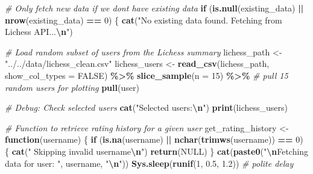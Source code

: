 \documentclass[
]{article}
\newenvironment{Shaded}{\begin{snugshade}}{\end{snugshade}}
\newcommand{\AttributeTok}[1]{\textcolor[rgb]{0.13,0.29,0.53}{#1}}
\newcommand{\CommentTok}[1]{\textcolor[rgb]{0.56,0.35,0.01}{\textit{#1}}}
\newcommand{\ConstantTok}[1]{\textcolor[rgb]{0.56,0.35,0.01}{#1}}
\newcommand{\ControlFlowTok}[1]{\textcolor[rgb]{0.13,0.29,0.53}{\textbf{#1}}}
\newcommand{\DecValTok}[1]{\textcolor[rgb]{0.00,0.00,0.81}{#1}}
\newcommand{\FloatTok}[1]{\textcolor[rgb]{0.00,0.00,0.81}{#1}}
\newcommand{\FunctionTok}[1]{\textcolor[rgb]{0.13,0.29,0.53}{\textbf{#1}}}
\newcommand{\NormalTok}[1]{#1}
\newcommand{\OtherTok}[1]{\textcolor[rgb]{0.56,0.35,0.01}{#1}}
\newcommand{\SpecialCharTok}[1]{\textcolor[rgb]{0.81,0.36,0.00}{\textbf{#1}}}
\newcommand{\StringTok}[1]{\textcolor[rgb]{0.31,0.60,0.02}{#1}}
\begin{document}
\begin{Shaded}
\begin{Highlighting}[]
\CommentTok{\# Only fetch new data if we don\textquotesingle{}t have existing data}
\ControlFlowTok{if}\NormalTok{ (}\FunctionTok{is.null}\NormalTok{(existing\_data) }\SpecialCharTok{||} \FunctionTok{nrow}\NormalTok{(existing\_data) }\SpecialCharTok{==} \DecValTok{0}\NormalTok{) \{}
    \FunctionTok{cat}\NormalTok{(}\StringTok{"No existing data found. Fetching from Lichess API...}\SpecialCharTok{\textbackslash{}n}\StringTok{"}\NormalTok{)}

    \CommentTok{\# Load random subset of users from the Lichess summary}
\NormalTok{    lichess\_path }\OtherTok{\textless{}{-}} \StringTok{"../../data/lichess\_clean.csv"}
\NormalTok{    lichess\_users }\OtherTok{\textless{}{-}} \FunctionTok{read\_csv}\NormalTok{(lichess\_path, }\AttributeTok{show\_col\_types =} \ConstantTok{FALSE}\NormalTok{) }\SpecialCharTok{\%\textgreater{}\%}
        \FunctionTok{slice\_sample}\NormalTok{(}\AttributeTok{n =} \DecValTok{15}\NormalTok{) }\SpecialCharTok{\%\textgreater{}\%} \CommentTok{\# pull 15 random users for plotting}
        \FunctionTok{pull}\NormalTok{(user)}

    \CommentTok{\# Debug: Check selected users}
    \FunctionTok{cat}\NormalTok{(}\StringTok{"Selected users:}\SpecialCharTok{\textbackslash{}n}\StringTok{"}\NormalTok{)}
    \FunctionTok{print}\NormalTok{(lichess\_users)}

    \CommentTok{\# Function to retrieve rating history for a given user}
\NormalTok{    get\_rating\_history }\OtherTok{\textless{}{-}} \ControlFlowTok{function}\NormalTok{(username) \{}
        \ControlFlowTok{if}\NormalTok{ (}\FunctionTok{is.na}\NormalTok{(username) }\SpecialCharTok{||} \FunctionTok{nchar}\NormalTok{(}\FunctionTok{trimws}\NormalTok{(username)) }\SpecialCharTok{==} \DecValTok{0}\NormalTok{) \{}
            \FunctionTok{cat}\NormalTok{(}\StringTok{"  Skipping invalid username}\SpecialCharTok{\textbackslash{}n}\StringTok{"}\NormalTok{)}
            \FunctionTok{return}\NormalTok{(}\ConstantTok{NULL}\NormalTok{)}
\NormalTok{        \}}
        \FunctionTok{cat}\NormalTok{(}\FunctionTok{paste0}\NormalTok{(}\StringTok{"}\SpecialCharTok{\textbackslash{}n}\StringTok{Fetching data for user: "}\NormalTok{, username, }\StringTok{"}\SpecialCharTok{\textbackslash{}n}\StringTok{"}\NormalTok{))}
        \FunctionTok{Sys.sleep}\NormalTok{(}\FunctionTok{runif}\NormalTok{(}\DecValTok{1}\NormalTok{, }\FloatTok{0.5}\NormalTok{, }\FloatTok{1.2}\NormalTok{)) }\CommentTok{\# polite delay}


\end{Highlighting}
\end{Shaded}
\end{document}
